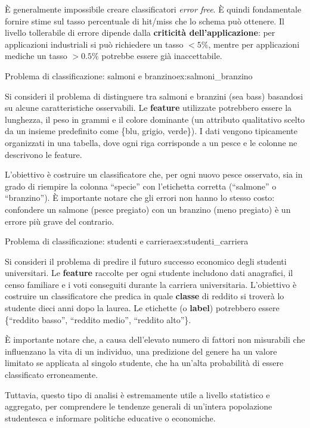 È generalmente impossibile creare classificatori \textit{error free}.
È quindi fondamentale fornire stime sul tasso percentuale di hit/miss
che lo schema può ottenere. Il livello tollerabile di errore
dipende dalla \textbf{criticità dell'applicazione}: per applicazioni
industriali si può richiedere un tasso $< 5\%$, mentre per
applicazioni mediche un tasso $> 0.5\%$ potrebbe essere
già inaccettabile.


\begin{esempio}{Problema di classificazione: salmoni e branzino}{ex:salmoni_branzino}

Si consideri il problema di distinguere tra salmoni e branzini (sea bass) basandosi
su alcune caratteristiche osservabili.
Le \textbf{feature} utilizzate potrebbero essere la lunghezza, il peso in grammi
e il colore dominante (un attributo qualitativo scelto da un insieme predefinito
come \{blu, grigio, verde\}).
I dati vengono tipicamente organizzati in una tabella, dove ogni riga corrisponde
a un pesce e le colonne ne descrivono le feature.

L'obiettivo è costruire un classificatore che, per ogni nuovo pesce osservato,
sia in grado di riempire la colonna ``specie'' con l'etichetta corretta
(``salmone'' o ``branzino'').
È importante notare che gli errori non hanno lo stesso costo: confondere un
salmone (pesce pregiato) con un branzino (meno pregiato) è un errore più grave
del contrario.

\end{esempio}

\begin{esempio}{Problema di classificazione: studenti e carriera}{ex:studenti_carriera}

Si consideri il problema di predire il futuro successo economico degli studenti
universitari.
Le \textbf{feature} raccolte per ogni studente includono dati anagrafici, il
censo familiare e i voti conseguiti durante la carriera universitaria.
L'obiettivo è costruire un classificatore che predica in quale \textbf{classe}
di reddito si troverà lo studente dieci anni dopo la laurea. Le etichette
(o \textbf{label}) potrebbero essere \{``reddito basso'', ``reddito medio'',
``reddito alto''\}.

È importante notare che, a causa dell'elevato numero di fattori non misurabili
che influenzano la vita di un individuo, una predizione del genere ha un valore
limitato se applicata al singolo studente, che ha un'alta probabilità di essere
classificato erroneamente.

Tuttavia, questo tipo di analisi è estremamente utile a livello statistico e
aggregato, per comprendere le tendenze generali di un'intera popolazione
studentesca e informare politiche educative o economiche.

\end{esempio}

